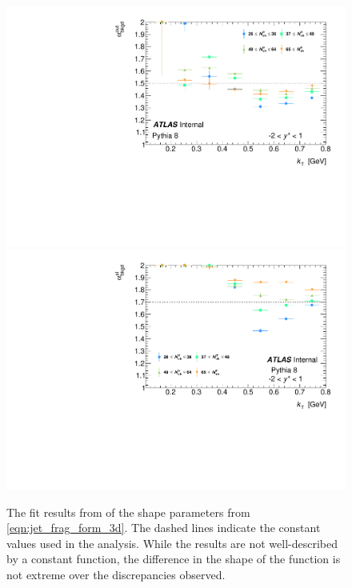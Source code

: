\begin{figure}[t]
\begin{minipage}[t]{1.0\textwidth}
\centering
\includegraphics[width=.49\linewidth]{canqosl_backAlphaOut_vs_kt.pdf}
\includegraphics[width=.49\linewidth]{canqosl_backAlpha_vs_kt.pdf}\\
\end{minipage}
\caption{The fit results from  of the shape parameters from \cref{eqn:jet_frag_form_3d}. The dashed lines indicate the constant values used in the analysis. While the results are not well-described by a constant function, the difference in the shape of the function is not extreme over the discrepancies observed.}
\label{fig:pythia_bkgd_alpha}
\end{figure}



